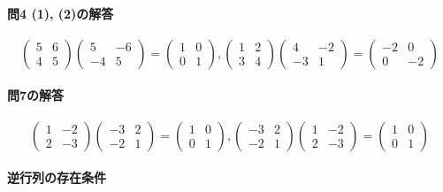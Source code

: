 \paragraph{問4 (1), (2)の解答}
\[
\begin{pmatrix}
5 & 6 \\
4 & 5
\end{pmatrix}
\begin{pmatrix}
5 & -6 \\
-4 & 5
\end{pmatrix}
=
\begin{pmatrix}
1 & 0 \\
0 & 1
\end{pmatrix}, 
\begin{pmatrix}
1 & 2 \\
3 & 4
\end{pmatrix}
\begin{pmatrix}
4 & -2 \\
-3 & 1
\end{pmatrix}
=
\begin{pmatrix}
-2 & 0 \\
0 & -2
\end{pmatrix}
\]

\paragraph{問7の解答}

\[
\begin{pmatrix}
1 & -2 \\
2 & -3
\end{pmatrix}
\begin{pmatrix}
-3 & 2 \\
-2 & 1
\end{pmatrix}
=
\begin{pmatrix}
1 & 0 \\
0 & 1
\end{pmatrix}, 
\begin{pmatrix}
-3 & 2 \\
-2 & 1
\end{pmatrix}
\begin{pmatrix}
1 & -2 \\
2 & -3
\end{pmatrix}
= 
\begin{pmatrix}
1 & 0 \\
0 & 1
\end{pmatrix}
\]

\paragraph{逆行列の存在条件}


